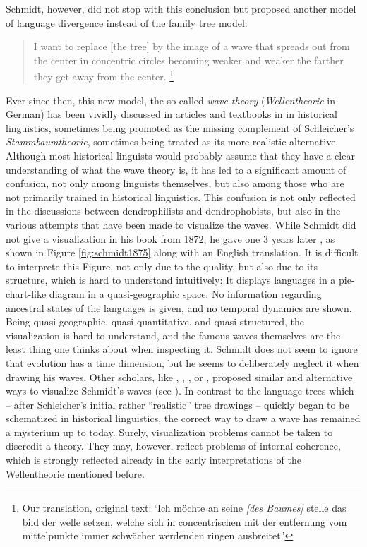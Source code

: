 \documentclass[svgnames,12pt]{scrartcl}
\begin{document}
{Schmidt, however, did not stop with this conclusion but proposed another model of language
divergence instead of the family tree model:

\begin{quote} \small I want to replace [the tree] by the image of a wave that spreads out from the
     center in concentric circles becoming weaker and weaker the farther they get away from the
     center. \citep[27]{Schmidt1872}\footnote{Our translation, original text: `Ich möchte an seine
     \emph{[des Baumes]} stelle das bild der welle setzen, welche sich in concentrischen mit der
     entfernung vom mittelpunkte immer schwächer werdenden ringen ausbreitet.'} 
\end{quote}

Ever since then, this new model, the
so-called \emph{wave theory} (\emph{Wellentheorie} in German) has been vividly discussed in articles and textbooks in
in historical linguistics, sometimes being promoted as the missing complement of Schleicher's
\emph{Stammbaumtheorie}, sometimes being treated as its more realistic alternative.
Although most historical linguists would probably assume that they have a clear understanding of
what the wave theory is, it has led to a significant amount of confusion, not only among linguists
themselves, but also among those who are not primarily trained in historical linguistics.
This confusion is not only reflected in the discussions between dendrophilists and dendrophobists,
but also in the various attempts that have been made to visualize the waves.
While Schmidt did
not give a visualization in his book from 1872, he gave one 3 years later \citep[199]{Schmidt1875},
as shown in Figure \ref{fig:schmidt1875} along with an English translation.
It is difficult to interprete this Figure, not only due to the quality, but also due to its
structure, which is hard to understand intuitively: It displays languages in a pie-chart-like
diagram in a quasi-geographic space. No information regarding ancestral states of the languages is
given, and no temporal dynamics are shown. Being quasi-geographic, quasi-quantitative, and
quasi-structured, the visualization is hard to understand, and the famous waves themselves are the
least thing one thinks about when inspecting it. Schmidt does not seem to ignore that evolution has
a time dimension, but he seems to deliberately neglect it when drawing his waves.
Other scholars, like \citet[93]{Hirt1905}, \citet[316]{Bloomfield1933}, \citet[134]{Meillet1908}, or
\citet[174]{Bonfante1931}, proposed similar and alternative ways to visualize Schmidt's waves (see
\citealt{Geisler2013}). In contrast to the language trees which – after Schleicher's initial rather
``realistic'' tree drawings – quickly began to be schematized in historical linguistics, the correct
way to draw a wave has remained a mysterium up to today.
Surely, visualization problems cannot be taken to discredit a theory. They may, however, reflect
problems of internal coherence, which is strongly reflected already in the early interpretations of
the Wellentheorie mentioned before. 

}
\end{document}

